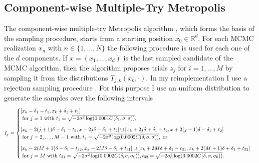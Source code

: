 \documentclass{scrartcl}
\begin{document}
    \subsection{Component-wise Multiple-Try Metropolis} The component-wise multiple-try Metropolis algorithm \cite[Algorithm 1]{lau2019},
    which forms the basis of the sampling procedure, starts from a starting position
	$x_0\in\mathbb{R}^d$. For each MCMC realization $x_n$ with $n\in\{1,\dots,N\}$ the following procedure is used for each one of the $d$ components. If $x=(x_1,\dots,x_d)$ is the last sampled candidate of the MCMC algorithm, then the algorithm proposes trials $z_j$
    for $i=1,\dots,M$ by sampling it from the distributions $T_{j,k}(x_k,\cdot)$. In my reimplementation
    I use a rejection sampling procedure \cite{rejection_sampling}. For this purpose I use an uniform distribution to generate the samples over the following intervals
    \begin{align*}
        I_j = \begin{cases}
                  [x_k-\delta_1-t_1,x_k+\delta_1+t_1]\\\text{ for }j=1\text{ with }t_1 = \sqrt{-2\sigma^2\log(0.0001C(\delta_1,\sigma,\sigma))},\vspace{.25cm}\\
                  [x_k-2(j+1)\delta-\delta_1-t_2,x-2j\delta-\delta_1+t_2]\cup[x_k+2j\delta+\delta_1-t_2,x+2(j+1)\delta-\delta_1+t_2]\\\text{ for }j=2,\dots,M-1\text{ with }t_2=\sqrt{-2\sigma^2\log(0.0002C(\delta,\sigma,\sigma))},\text{ or}\vspace{.25cm}\\
                  [x_k-2(M+1)\delta-\delta_1-t_{32},x_k-2M\delta-\delta_1+t_{31}]\cup[x_k+2M\delta+\delta_1-t_{31},x_k+2(M+1)\delta+\delta_1+t_{32}]\\\text{ for }j=M\text{ with }t_{31}=\sqrt{-2\sigma^2\log(0.0002C(\delta,\sigma,\sigma_0))},t_{32}=\sqrt{-2\sigma_0^2\log(0.0002C(\delta,\sigma,\sigma_0))}.
        \end{cases}
    \end{align*}
\end{document}
